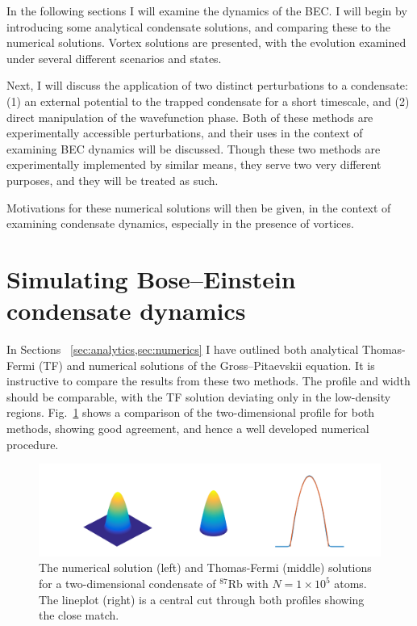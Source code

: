 In the following sections I will examine the dynamics of the BEC. I will begin by introducing some analytical condensate solutions, and comparing these to the numerical solutions. Vortex solutions are presented, with the evolution examined under several different scenarios and states.

Next, I will discuss the application of two distinct perturbations to a condensate: (1) an external potential to the trapped condensate for a short timescale, and (2) direct manipulation of the wavefunction phase. Both of these methods are experimentally accessible perturbations, and their uses in the context of examining BEC dynamics will be discussed. Though these two methods are experimentally implemented by similar means, they serve two very different purposes, and they will be treated as such.

Motivations for these numerical solutions will then be given, in the context of examining condensate dynamics, especially in the presence of vortices.

\section{Simulating Bose--Einstein condensate dynamics}

In Sections ~\ref{sec:analytics,sec:numerics} I have outlined both analytical Thomas-Fermi (TF) and numerical solutions of the Gross--Pitaevskii equation. It is instructive to compare the results from these two methods. The profile and width should be comparable, with the TF solution deviating only in the low-density regions. Fig.~\ref{fig:gpe_tf_3} shows a comparison of the two-dimensional profile for both methods, showing good agreement, and hence a well developed numerical procedure.
\begin{figure}\centering
    \includegraphics[width=\textwidth,trim=0ex 0ex 0ex 0ex]{Images/ch4_vtx/gpe_tf_3.pdf}
    \caption{The numerical solution (left) and Thomas-Fermi (middle) solutions for a two-dimensional condensate of $^{87}$Rb with $N=1\times 10^5$ atoms. The lineplot (right) is a central cut through both profiles showing the close match.}\label{fig:gpe_tf_3}
\end{figure}

